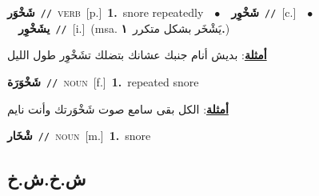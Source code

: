 \documentclass[10pt,a4paper,twoside]{article} %
\begin{document}
\begin{multicols}{2}
{\setlength\topsep{0pt}\textbf{\foreignlanguage{arabic}{شَخْوَر}}\ {\color{gray}\texttt{//}\color{black}}\ \textsc{verb}\ [p.]\ \textbf{1.}~snore repeatedly\ \ $\bullet$\ \ \setlength\topsep{0pt}\textbf{\foreignlanguage{arabic}{شَخْوِر}}\ {\color{gray}\texttt{//}\color{black}}\ [c.]\ \ $\bullet$\ \ \setlength\topsep{0pt}\textbf{\foreignlanguage{arabic}{يشَخْوِر}}\ {\color{gray}\texttt{//}\color{black}}\ [i.]\ \color{gray}(msa. \foreignlanguage{arabic}{يَشْخَر بشكل متكرر}~\foreignlanguage{arabic}{\textbf{١.}})\color{black}\  \begin{flushright}\color{gray}\foreignlanguage{arabic}{\textbf{\underline{\foreignlanguage{arabic}{أمثلة}}}: بديش أنام جنبك عشانك بتضلك تشَخْوِر طول الليل}\end{flushright}\color{black}} \vspace{2mm}

{\setlength\topsep{0pt}\textbf{\foreignlanguage{arabic}{شَخْوَرَة}}\ {\color{gray}\texttt{//}\color{black}}\ \textsc{noun}\ [f.]\ \textbf{1.}~repeated snore\  \begin{flushright}\color{gray}\foreignlanguage{arabic}{\textbf{\underline{\foreignlanguage{arabic}{أمثلة}}}: الكل بقى سامع صوت شَخْوَرتك وأنت نايم}\end{flushright}\color{black}} \vspace{2mm}

{\setlength\topsep{0pt}\textbf{\foreignlanguage{arabic}{شْخَار}}\ {\color{gray}\texttt{//}\color{black}}\ \textsc{noun}\ [m.]\ \textbf{1.}~snore\ } \vspace{2mm}

\vspace{-3mm}
\subsection*{\color{blue}\foreignlanguage{arabic}{ش.خ.ش.خ}\color{blue}{}} 


\end{multicols}
\end{document}
